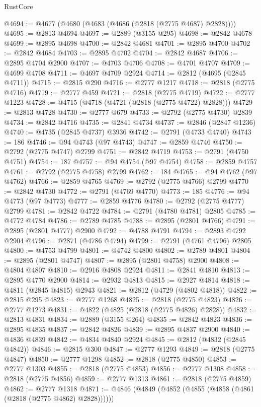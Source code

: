 \begin{lexlean}{RustCore}
\begin{coremodule}
@4694 := @4677 (@4680 (@4683 (@4686 (@2818 (@2775 @4687) @2828))))
@4695 := @2813 @4694
@4697 := @2889 (@3155 @295)
@4698 := @2842 @4678
@4699 := @2895 @4698
@4700 := @2842 @4681
@4701 := @2895 @4700
@4702 := @2842 @4684
@4703 := @2895 @4702
@4704 := @2842 @4687
@4706 := @2895 @4704 @2900
@4707 := @4703 @4706
@4708 := @4701 @4707
@4709 := @4699 @4708
@4711 := @4697 @4709 @2924
@4714 := @2812 (@4695 (@2845 @4711))
@4715 := @2815 @290
@4716 := @2777 @1217
@4718 := @2818 (@2775 @4716)
@4719 := @2777 @459
@4721 := @2818 (@2775 @4719)
@4722 := @2777 @1223
@4728 := @4715 (@4718 (@4721 (@2818 (@2775 @4722) @2828)))
@4729 := @2813 @4728
@4730 := @2777 @679
@4733 := @2792 (@2775 @4730) @2839
@4734 := @2842 @4716
@4735 := @2841 @4734
@4737 := @2846 (@2847 @1236)
@4740 := @4735 (@2845 @4737) @3936
@4742 := @2791 (@4733 @4740)
@4743 := 186
@4746 := @94 @4743 (@97 @4743)
@4747 := @2859 @4746
@4750 := @2792 (@2775 @4747) @2799
@4751 := @2842 @4719
@4753 := @2791 (@4750 @4751)
@4754 := 187
@4757 := @94 @4754 (@97 @4754)
@4758 := @2859 @4757
@4761 := @2792 (@2775 @4758) @2799
@4762 := 184
@4765 := @94 @4762 (@97 @4762)
@4766 := @2859 @4765
@4769 := @2792 (@2775 @4766) @2799
@4770 := @2842 @4730
@4772 := @2791 (@4769 @4770)
@4773 := 185
@4776 := @94 @4773 (@97 @4773)
@4777 := @2859 @4776
@4780 := @2792 (@2775 @4777) @2799
@4781 := @2842 @4722
@4784 := @2791 (@4780 @4781) @2805
@4785 := @4772 @4784
@4786 := @2789 @4785
@4788 := @2895 (@2801 @4766)
@4791 := @2895 (@2801 @4777) @2900
@4792 := @4788 @4791
@4794 := @2893 @4792 @2904
@4796 := @2871 (@4786 @4794)
@4799 := @2791 (@4761 @4796) @2805
@4800 := @4753 @4799
@4801 := @4742 @4800
@4802 := @2789 @4801
@4804 := @2895 (@2801 @4747)
@4807 := @2895 (@2801 @4758) @2900
@4808 := @4804 @4807
@4810 := @2916 @4808 @2924
@4811 := @2841 @4810
@4813 := @2895 @4770 @2900
@4814 := @2932 @4813
@4815 := @2927 @4814
@4818 := @4811 (@2845 @4815) @2943
@4821 := @2812 (@4729 (@4802 @4818))
@4822 := @2815 @295
@4823 := @2777 @1268
@4825 := @2818 (@2775 @4823)
@4826 := @2777 @1273
@4831 := @4822 (@4825 (@2818 (@2775 @4826) @2828))
@4832 := @2813 @4831
@4834 := @2889 (@3155 @264)
@4835 := @2842 @4823
@4836 := @2895 @4835
@4837 := @2842 @4826
@4839 := @2895 @4837 @2900
@4840 := @4836 @4839
@4842 := @4834 @4840 @2924
@4845 := @2812 (@4832 (@2845 @4842))
@4846 := @2815 @300
@4847 := @2777 @1293
@4849 := @2818 (@2775 @4847)
@4850 := @2777 @1298
@4852 := @2818 (@2775 @4850)
@4853 := @2777 @1303
@4855 := @2818 (@2775 @4853)
@4856 := @2777 @1308
@4858 := @2818 (@2775 @4856)
@4859 := @2777 @1313
@4861 := @2818 (@2775 @4859)
@4862 := @2777 @1318
@4871 := @4846 (@4849 (@4852 (@4855 (@4858 (@4861 (@2818 (@2775 @4862) @2828))))))

\end{coremodule}
\end{lexlean}
